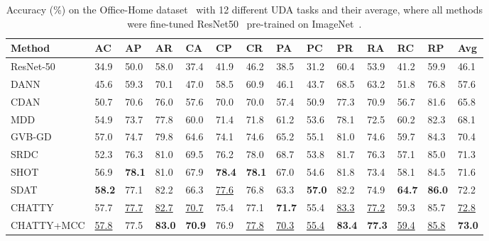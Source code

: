 \documentclass[10pt,twocolumn,letterpaper]{article}
\begin{document}
\begin{table*}
\begin{center}
\begin{tabular}{|l|p{0.7cm}|p{0.7cm}|p{0.7cm}|p{0.7cm}|p{0.7cm}|p{0.7cm}|p{0.7cm}|p{0.7cm}|p{0.7cm}|p{0.7cm}|p{0.7cm}|p{0.7cm}|p{0.5cm}|}
\hline
Method	&	AC	&	AP	&	AR	&	CA	&	CP	&	CR	&	PA	&	PC	&	PR	&	RA	&	RC	&	RP	&	Avg	\\
\hline
ResNet-50~\cite{resnet}	&	34.9	&	50.0	&	58.0	&	37.4	&	41.9	&	46.2	&	38.5	&	31.2	&	60.4	&	53.9	&	41.2	&	59.9	&	46.1	\\
DANN~\cite{dann}	&	45.6	&	59.3	&	70.1	&	47.0	&	58.5	&	60.9	&	46.1	&	43.7	&	68.5	&	63.2	&	51.8	&	76.8	&	57.6	\\
CDAN~\cite{cdan}	&	50.7	&	70.6	&	76.0	&	57.6	&	70.0	&	70.0	&	57.4  &	50.9	&	77.3	&	70.9	&	56.7	&	81.6	&	65.8	\\
MDD~\cite{mdd} &	54.9	&	73.7	&	77.8	&	60.0	&	71.4	&	71.8	&	61.2	&	53.6	&	78.1	&	72.5	&	60.2	&	82.3	&	68.1	\\
GVB-GD~\cite{gvb} &	57.0	&	74.7	&	79.8	&	64.6	&	74.1	&	74.6	&	65.2	&	55.1	&	81.0	&	74.6	&	59.7	&	84.3	&	70.4	\\
SRDC~\cite{srdc} &	52.3	&	76.3	&	81.0	&	69.5	&	76.2	&	78.0	&	68.7	&	53.8	&	81.7	&	76.3	&	57.1	&	85.0	&	71.3	\\
SHOT~\cite{shot} &	56.9	&	\textbf{78.1}	&	81.0	&	67.9	&	\textbf{78.4}	&	\textbf{78.1}	&	67.0	&	54.6	&	81.8	&	73.4	&	58.1	&	84.5	&	71.6	\\
SDAT	~\cite{sdat}&	\textbf{58.2}	&	77.1	&	82.2	&	66.3	&	\underline{77.6} &	76.8	&	63.3	&	\textbf{57.0}	&	82.2	&	74.9	&	\textbf{64.7}	&	\textbf{86.0}	&	72.2	\\
\hline
CHATTY	&	57.7	&	\underline{77.7} &	\underline{82.7} &	\underline{70.7} &	75.4	&	77.1	&	\textbf{71.7}	&	55.4	&	\underline{83.3} &	\underline{77.2} &	59.3	&	85.7	&	\underline{72.8} \\
CHATTY+MCC	&	\underline{57.8} &	77.5	&	\textbf{83.0}	&	\textbf{70.9}	&	76.9	&	\underline{77.8} &	\underline{70.3} &	\underline{55.4} &	\textbf{83.4}	&	\textbf{77.3}	&	\underline{59.4} &	\underline{85.8} &	\textbf{73.0}	\\
\hline
\end{tabular}
\end{center}
\caption{Accuracy (\%) on the Office-Home dataset~\cite{office-home} with 12 different UDA tasks and their average, where all methods were fine-tuned ResNet50~\cite{resnet} pre-trained on ImageNet~\cite{imagenet}.}
\label{table:office-home}
\end{table*}
\end{document}
